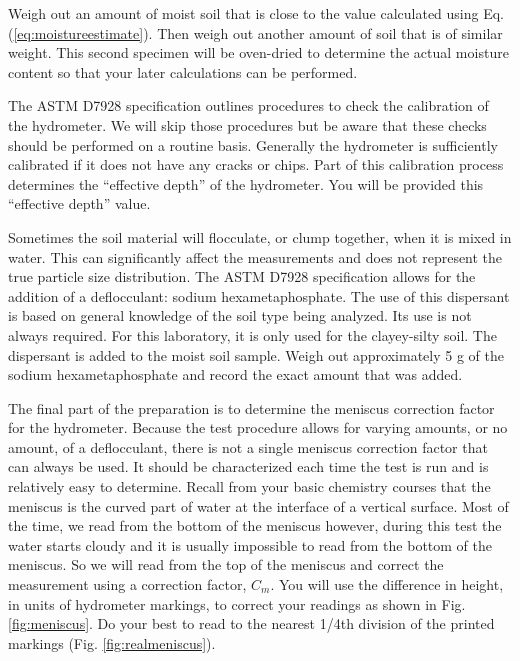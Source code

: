 \documentclass[12pt]{article}
\begin{document}
Weigh out an amount of moist soil that is close to the value calculated using Eq. (\ref{eq:moistureestimate}). Then weigh out another amount of soil that is of similar weight. This second specimen will be oven-dried to determine the actual moisture content so that your later calculations can be performed.

The ASTM D7928 specification outlines procedures to check the calibration of the hydrometer. We will skip those procedures but be aware that these checks should be performed on a routine basis. Generally the hydrometer is sufficiently calibrated if it does not have any cracks or chips. Part of this calibration process determines the ``effective depth'' of the hydrometer. You will be provided this ``effective depth'' value.

Sometimes the soil material will flocculate, or clump together, when it is mixed in water. This can significantly affect the measurements and does not represent the true particle size distribution. The ASTM D7928 specification allows for the addition of a deflocculant: sodium hexametaphosphate. The use of this dispersant is based on general knowledge of the soil type being analyzed. Its use is not always required. For this laboratory, it is only used for the clayey-silty soil. The dispersant is added to the moist soil sample. Weigh out approximately 5 g of the sodium hexametaphosphate and record the exact amount that was added.

The final part of the preparation is to determine the meniscus correction factor for the hydrometer. Because the test procedure allows for varying amounts, or no amount, of a deflocculant, there is not a single meniscus correction factor that can always be used. It should be characterized each time the test is run and is relatively easy to determine. Recall from your basic chemistry courses that the meniscus is the curved part of water at the interface of a vertical surface. Most of the time, we read from the bottom of the meniscus however, during this test the water starts cloudy and it is usually impossible to read from the bottom of the meniscus. So we will read from the top of the meniscus and correct the measurement using a correction factor, $C_m$. You will use the difference in height, in units of hydrometer markings, to correct your readings as shown in Fig. \ref{fig:meniscus}. Do your best to read to the nearest 1/4th division of the printed markings (Fig. \ref{fig:realmeniscus}).
\end{document}
